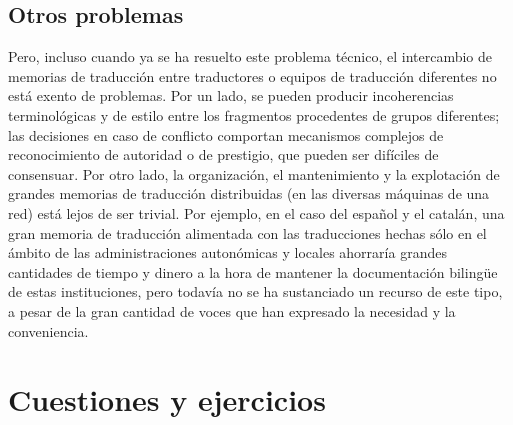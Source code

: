 \subsection{Otros problemas} Pero, incluso cuando ya se ha resuelto este problema técnico, el intercambio de memorias de traducción entre traductores o equipos de traducción diferentes no está exento de problemas. Por un lado, se pueden producir incoherencias terminológicas y de estilo entre los fragmentos procedentes de grupos diferentes; las decisiones en caso de conflicto comportan mecanismos complejos de reconocimiento de autoridad o de prestigio, que pueden ser difíciles de consensuar. Por otro lado, la organización, el mantenimiento y la explotación de grandes memorias de traducción distribuidas (en las diversas máquinas de una red) está lejos de ser trivial. Por ejemplo, en el caso del español y el catalán, una gran memoria de traducción alimentada con las traducciones hechas sólo en el ámbito de las administraciones autonómicas y locales ahorraría grandes cantidades de tiempo y dinero a la hora de mantener la documentación bilingüe de estas instituciones, pero todavía no se ha sustanciado un recurso de este tipo, a pesar de la gran cantidad de voces que han expresado la necesidad y la conveniencia. 

\section{Cuestiones y ejercicios} 

